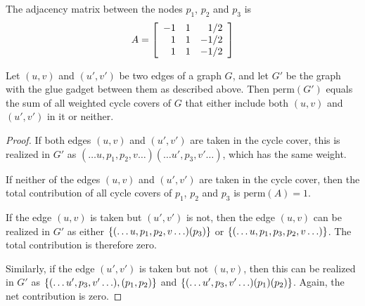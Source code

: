 \begin{center}
\end{center}
The adjacency matrix between the nodes $p_1$, $p_2$ and $p_3$ is 
\[
A = \left[\begin{array}{rrr}
-1 & 1 & 1/2\\
1 & 1 & -1/2\\
1 & 1 & -1/2
\end{array}\right]
\]

\noindent
\begin{claim}
Let $(u,v)$ and $(u',v')$ be two edges of a graph $G$, and let $G'$ be the graph with the glue gadget between them as described above. 
Then $\mathrm{perm}(G')$ equals the sum of all weighted cycle covers of $G$ that either include both $(u,v)$ and $(u',v')$ in it or neither. 
\end{claim}
\begin{proof}
If both edges $(u,v)$ and $(u',v')$ are taken in the cycle cover, this is realized in $G'$ as ${(\ldots u,p_1, p_2, v \ldots) (\ldots u', p_3, v' \ldots)}$, which has the same weight.  

If neither of the edges $(u,v)$ and $(u',v')$ are taken in the cycle cover, then the total contribution of all cycle covers of $p_1$, $p_2$ and $p_3$ is $\mathrm{perm}(A) = 1$. 

If the edge $(u,v)$ is taken but $(u',v')$ is not, then the edge $(u,v)$ can be realized in $G'$ as either $\left\{(\ldots u,p_1,p_2,v \ldots) (p_3)\right\}$ or $\left\{(\ldots u,p_1,p_3,p_2,v \ldots )\right\}$. 
The total contribution is therefore zero. 

Similarly, if the edge $(u',v')$ is taken but not $(u,v)$, then this can be realized in $G'$ as $\left\{(\ldots u',p_3,v' \ldots),(p_1,p_2)\right\}$ and $\left\{(\ldots u',p_3, v' \ldots) (p_1) (p_2)\right\}$. 
Again, the net contribution is zero.  
\end{proof}

